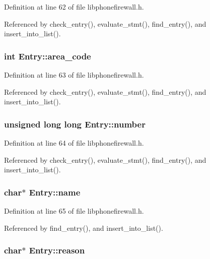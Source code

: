 Definition at line 62 of file libphonefirewall.h.

Referenced by check\_\-entry(), evaluate\_\-stmt(), find\_\-entry(), and insert\_\-into\_\-list().\hypertarget{structEntry_9de7b96e5b65796bd35e9dc730dcd8b3}{
\subsubsection{\setlength{\rightskip}{0pt plus 5cm}int {\bf Entry::area\_\-code}}}
\label{structEntry_9de7b96e5b65796bd35e9dc730dcd8b3}




Definition at line 63 of file libphonefirewall.h.

Referenced by check\_\-entry(), evaluate\_\-stmt(), find\_\-entry(), and insert\_\-into\_\-list().\hypertarget{structEntry_1f2177afed89936f82c130ae13fb107c}{
\subsubsection{\setlength{\rightskip}{0pt plus 5cm}unsigned long long {\bf Entry::number}}}
\label{structEntry_1f2177afed89936f82c130ae13fb107c}




Definition at line 64 of file libphonefirewall.h.

Referenced by check\_\-entry(), evaluate\_\-stmt(), find\_\-entry(), and insert\_\-into\_\-list().\hypertarget{structEntry_272e382d3efed5f970c7939742ec9603}{
\subsubsection{\setlength{\rightskip}{0pt plus 5cm}char$\ast$ {\bf Entry::name}}}
\label{structEntry_272e382d3efed5f970c7939742ec9603}




Definition at line 65 of file libphonefirewall.h.

Referenced by find\_\-entry(), and insert\_\-into\_\-list().\hypertarget{structEntry_2082cdbb815dfa8b81309cd395d32986}{
\subsubsection{\setlength{\rightskip}{0pt plus 5cm}char$\ast$ {\bf Entry::reason}}}
\label{structEntry_2082cdbb815dfa8b81309cd395d32986}




